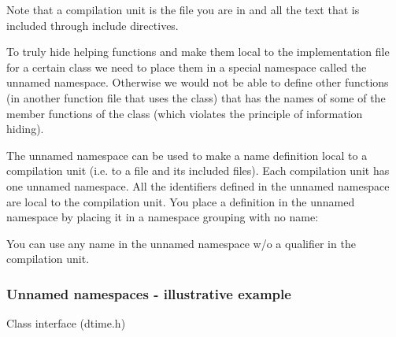 Note that a compilation unit is the file you are in and all the text that is included through include
directives.

To truly hide helping functions and make them local to the implementation file for a certain class
we need to place them in a special namespace called the unnamed namespace. Otherwise we
would not be able to define other functions (in another function file that uses the class) that has
the names of some of the member functions of the class (which violates the principle of
information hiding).

The unnamed namespace can be used to make a name definition local to a compilation unit
(i.e. to a file and its included files). Each compilation unit has one unnamed namespace. All
the identifiers defined in the unnamed namespace are local to the compilation unit. You place
a definition in the unnamed namespace by placing it in a namespace grouping with no name:


You can use any name in the unnamed namespace w/o a qualifier in the compilation unit.


\subsubsection*{Unnamed namespaces - illustrative example}

\noindent
Class interface (dtime.h)

